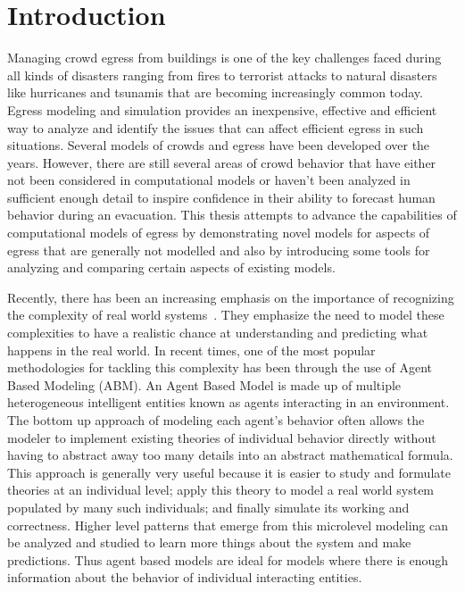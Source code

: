
\chapter{Introduction}
\label{chapter:Introduction}

Managing crowd egress from buildings is one of the key challenges faced during all kinds of disasters ranging from fires to terrorist attacks to natural disasters like hurricanes and tsunamis that are becoming increasingly common today. Egress modeling and simulation provides an inexpensive, effective and efficient way to analyze and identify the issues that can affect efficient egress in such situations. Several models of crowds and egress have been developed over the years. However, there are still several areas of crowd behavior that have either not been considered in computational models or haven't been analyzed in sufficient enough detail to inspire confidence in their ability to forecast human behavior during an evacuation. This thesis attempts to advance the capabilities of computational models of egress by demonstrating novel models for aspects of egress that are generally not modelled and also by introducing some tools for analyzing and comparing certain aspects of existing models.




Recently, there has been an increasing emphasis on the importance of recognizing the complexity of real world systems~\cite{Arthur:2010uy}. They emphasize the need to model these complexities to have a realistic chance at understanding and predicting what happens in the real world. In recent times, one of the most popular methodologies for tackling this complexity has been through the use of Agent Based Modeling (ABM). An Agent Based Model is made up of multiple heterogeneous intelligent entities known as agents interacting in an environment. The bottom up approach of modeling each agent's behavior often allows the modeler to implement existing theories of individual behavior directly without having to abstract away too many details into an abstract mathematical formula. This approach is generally very useful because it is easier to study and formulate theories at an individual level; apply this theory to model a real world system populated by many such individuals; and finally simulate its working and correctness. Higher level patterns that emerge from this microlevel modeling can be analyzed and studied to learn more things about the system and make predictions. Thus agent based models are ideal for models where there is enough information about the behavior of individual interacting entities.

